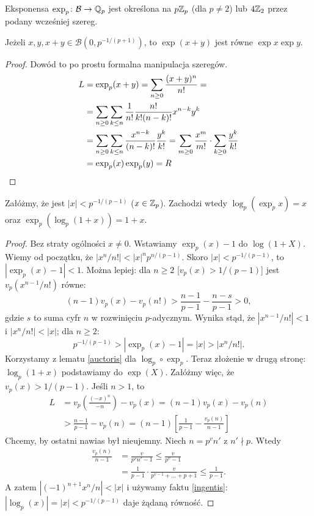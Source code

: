 \begin{definicja}
	Eksponensa $\exp_p \colon \mathcal B \to \mathbb{Q}_p$ jest określona na $p\mathbb{Z}_p$ (dla $p \neq 2$) lub $4\mathbb{Z}_2$ przez podany wcześniej szereg.
\end{definicja}

\begin{fakt}
	Jeżeli $x, y, x+y \in \mathcal B(0, p^{-1/(p+1)})$, to $\exp(x+y)$ jest równe $\exp x \exp y$.
\end{fakt}

\begin{proof}
	Dowód to po prostu formalna manipulacja szeregów.
	\begin{align*}
		L & = \exp_p(x+y) = \sum_{n \ge 0} \frac{(x+y)^n}{n!} = \\
		& = \sum_{n \ge 0} \sum_{k \le n} \frac{1}{n!} \frac{n!}{k!(n-k)!} x^{n-k}y^k \\
		& = \sum_{n \ge 0} \sum_{k \le n} \frac{x^{n-k}}{(n-k)!} \frac{y^k}{k!} = \sum_{m \ge 0} \frac{x^m}{m!} \cdot \sum_{k \ge 0} \frac{y^k}{k!} \\
		& = \exp_p(x) \exp_p(y) = R\qedhere
	\end{align*}
\end{proof}

\begin{fakt}
	Załóżmy, że jest $|x| < p^{-1/(p-1)}$ ($x \in \mathbb{Z}_p$). Zachodzi wtedy $\log_p (\exp_p x) = x$ oraz $\exp_p(\log_p (1+x)) = 1 + x$.
\end{fakt}

\begin{proof}
	Bez straty ogólności $x \neq 0$.
	Wstawiamy $\exp_p(x) - 1$ do $\log(1 + X)$.
	Wiemy od początku, że $|x^n/n!| < |x|^n p^{n/(p-1)}$.
	Skoro $|x| < p^{-1/(p-1)}$, to $|\exp_p(x) -1 | < 1$.
	Można lepiej: dla $n \ge 2$ [$v_p(x) > 1/(p-1)$] jest $v_p(x^{n-1}/n!)$ równe:
	\[
		(n-1)v_p(x) - v_p(n!) > \frac{n-1}{p-1} - \frac{n-s}{p-1} > 0,
	\]
	gdzie $s$ to suma cyfr $n$ w rozwinięciu $p$-adycznym.
	Wynika stąd, że $|x^{n-1} / n!| < 1$ i $|x^n/n!| < |x|$; dla $n \ge 2$:
	\[
		p^{-1/(p-1)} > |\exp_p(x) - 1| = |x| > |x^n/n!|.
	\]
	Korzystamy z lematu \ref{auctoris} dla $\log_p \circ \exp_p$.
	Teraz złożenie w drugą stronę: $\log_p(1+x)$ podstawiamy do $\exp(X)$. Załóżmy więc, że $v_p(x) > 1/(p-1)$.
	Jeśli $n > 1$, to
	\begin{align*}
		L & = v_p \left( \frac{(-x)^n}{-n} \right) - v_p(x) = (n-1) v_p(x) - v_p(n) \\
		& > \frac{n-1}{p-1} - v_p(n) = (n-1) \left[ \frac{1}{p-1} - \frac{v_p(n)}{n-1}\right]
	\end{align*}
	Chcemy, by ostatni nawias był nieujemny.
	Niech $n = p^v n'$ z $n ' \nmid p$.
	Wtedy
	\begin{align*}
		\frac{v_p(n)}{n-1} & = \frac{v}{p^v n' -1 } \le \frac{v}{p^v - 1} \\
		& = \frac{1}{p-1} \cdot \frac{v}{p^{v-1} + \ldots + p + 1} \le \frac{1}{p-1}.
	\end{align*}
	A zatem $|(-1)^{n+1} x^n/n| < |x|$ i używamy faktu \ref{ingentis}: $|\log_p(x)| = |x| < p^{-1/(p-1)}$ daje żądaną równość.
\end{proof}

